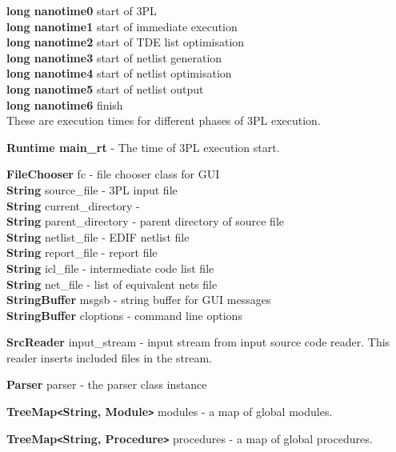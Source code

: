 \documentclass[10pt,a4paper,twoside,fleqn]{book}
\begin{document}
            {\bf long nanotime0} start of 3PL\\
            {\bf long nanotime1} start of immediate execution\\
            {\bf long nanotime2} start of TDE list optimisation\\
            {\bf long nanotime3} start of netlist generation\\
            {\bf long nanotime4} start of netlist optimisation\\
            {\bf long nanotime5} start of netlist output\\
            {\bf long nanotime6} finish\\
            These are execution times for different phases of 3PL execution.

            {\bf Runtime main\_rt} - The time of 3PL execution start.




            {\bf FileChooser} fc - file chooser class for GUI\\
            {\bf String} source\_file - 3PL input file\\
            {\bf String} current\_directory - \\
            {\bf String} parent\_directory - parent directory of source file\\
            {\bf String} netlist\_file - EDIF netlist file\\
            {\bf String} report\_file - report file\\
            {\bf String} icl\_file - intermediate code list file\\
            {\bf String} net\_file - list of equivalent nets file\\
            {\bf StringBuffer} msgsb - string buffer for GUI messages\\

            {\bf StringBuffer} cloptions - command line options

            {\bf SrcReader} input\_stream - input stream from input source code
            reader. This reader inserts included files in the stream.

            {\bf Parser} parser - the parser class instance

            {\bf TreeMap\verb'<'String, Module\verb'>'} modules -  a map of global modules. 

            {\bf TreeMap\verb'<'String, Procedure\verb'>'} procedures -  a map of global
            procedures.
\end{document}
